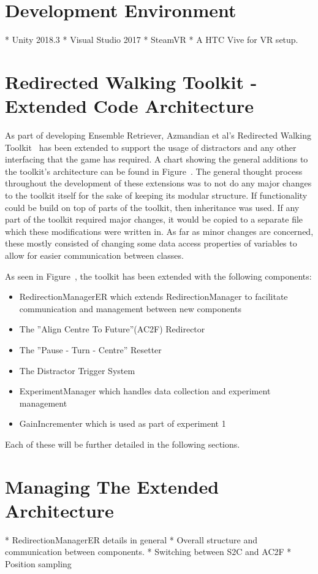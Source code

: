 \section{Development Environment}
* Unity 2018.3
* Visual Studio 2017
* SteamVR
* A HTC Vive for VR setup. 

\section{Redirected Walking Toolkit - Extended Code Architecture}
As part of developing Ensemble Retriever, Azmandian et al's Redirected Walking Toolkit~\cite{azmandian2016redirected} has been extended to support the usage of distractors and any other interfacing that the game has required. A chart showing the general additions to the toolkit's architecture can be found in Figure~. The general thought process throughout the development of these extensions was to not do any major changes to the toolkit itself for the sake of keeping its modular structure. If functionality could be build on top of parts of the toolkit, then inheritance was used. If any part of the toolkit required major changes, it would be copied to a separate file which these modifications were written in. As far as minor changes are concerned, these mostly consisted of changing some data access properties of variables to allow for easier communication between classes.

As seen in Figure~, the toolkit has been extended with the following components:
\begin{itemize}
    \item RedirectionManagerER which extends RedirectionManager to facilitate communication and management between new components
    \item The ''Align Centre To Future''(AC2F) Redirector
    \item The ''Pause - Turn - Centre'' Resetter
    \item The Distractor Trigger System
    \item ExperimentManager which handles data collection and experiment management
    \item GainIncrementer which is used as part of experiment 1
\end{itemize}

Each of these will be further detailed in the following sections. 

\section{Managing The Extended Architecture}
* RedirectionManagerER details in general
* Overall structure and communication between components.
* Switching between S2C and AC2F
* Position sampling

